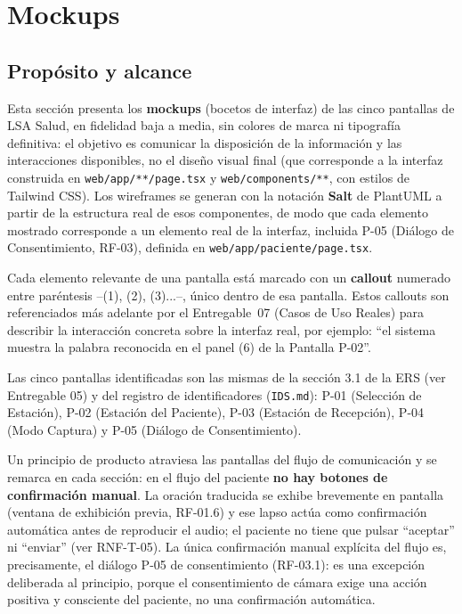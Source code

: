 \section{Mockups}

\subsection{Propósito y alcance}

Esta sección presenta los \textbf{mockups} (bocetos de interfaz) de las
cinco pantallas de LSA Salud, en fidelidad baja a media, sin colores de
marca ni tipografía definitiva: el objetivo es comunicar la disposición de
la información y las interacciones disponibles, no el diseño visual final
(que corresponde a la interfaz construida en \texttt{web/app/**/page.tsx} y
\texttt{web/components/**}, con estilos de Tailwind CSS). Los wireframes se
generan con la notación \textbf{Salt} de PlantUML a partir de la estructura
real de esos componentes, de modo que cada elemento mostrado corresponde a
un elemento real de la interfaz, incluida P-05 (Diálogo de Consentimiento,
RF-03), definida en \texttt{web/app/paciente/page.tsx}.

Cada elemento relevante de una pantalla está marcado con un \textbf{callout}
numerado entre paréntesis --(1), (2), (3)...--, único dentro de esa pantalla.
Estos callouts son referenciados más adelante por el Entregable~07 (Casos de
Uso Reales) para describir la interacción concreta sobre la interfaz real,
por ejemplo: ``el sistema muestra la palabra reconocida en el panel (6) de
la Pantalla P-02''.

Las cinco pantallas identificadas son las mismas de la sección 3.1 de la
ERS (ver Entregable 05) y del registro de identificadores (\texttt{IDS.md}):
P-01 (Selección de Estación), P-02 (Estación del Paciente), P-03 (Estación
de Recepción), P-04 (Modo Captura) y P-05 (Diálogo de Consentimiento).

Un principio de producto atraviesa las pantallas del flujo de comunicación y
se remarca en cada sección: en el flujo del paciente \textbf{no hay botones
de confirmación manual}. La oración traducida se exhibe brevemente en
pantalla (ventana de exhibición previa, RF-01.6) y ese lapso actúa como
confirmación automática antes de reproducir el audio; el paciente no tiene
que pulsar ``aceptar'' ni ``enviar'' (ver RNF-T-05). La única confirmación
manual explícita del flujo es, precisamente, el diálogo P-05 de
consentimiento (RF-03.1): es una excepción deliberada al principio, porque
el consentimiento de cámara exige una acción positiva y consciente del
paciente, no una confirmación automática.

